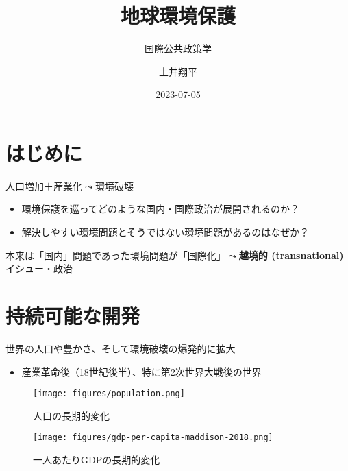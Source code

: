 \documentclass[
  xelatex,
  ja=standard]{bxjsarticle}
\title{地球環境保護}
\subtitle{国際公共政策学}
\author{土井翔平}
\date{2023-07-05}
\providecommand{\tightlist}{%
  \setlength{\itemsep}{0pt}\setlength{\parskip}{0pt}}\usepackage{longtable,booktabs,array}
\begin{document}
\maketitle
\ifdefined\Shaded\renewenvironment{Shaded}{\begin{tcolorbox}[borderline west={3pt}{0pt}{shadecolor}, interior hidden, breakable, enhanced, frame hidden, sharp corners, boxrule=0pt]}{\end{tcolorbox}}\fi

\hypertarget{ux306fux3058ux3081ux306b}{%
\section*{はじめに}\label{ux306fux3058ux3081ux306b}}

人口増加＋産業化\(\leadsto\)環境破壊

\begin{itemize}
\tightlist
\item
  環境保護を巡ってどのような国内・国際政治が展開されるのか？
\item
  解決しやすい環境問題とそうではない環境問題があるのはなぜか？
\end{itemize}

本来は「国内」問題であった環境問題が「国際化」\(\leadsto\)\textbf{越境的
(transnational)} イシュー・政治

\hypertarget{ux6301ux7d9aux53efux80fdux306aux958bux767a}{%
\section{持続可能な開発}\label{ux6301ux7d9aux53efux80fdux306aux958bux767a}}

世界の人口や豊かさ、そして環境破壊の爆発的に拡大

\begin{itemize}
\tightlist
\item
  産業革命後（18世紀後半）、特に第2次世界大戦後の世界
\end{itemize}

\begin{figure}[htpb]

{\centering \texttt{[image: figures/population.png]}

}

\caption{人口の長期的変化}

\end{figure}

\begin{figure}[htpb]

{\centering \texttt{[image: figures/gdp-per-capita-maddison-2018.png]}

}

\caption{一人あたりGDPの長期的変化}

\end{figure}
\end{document}
